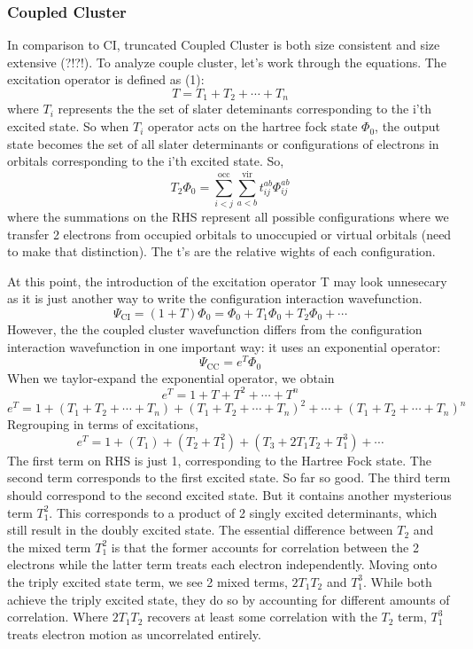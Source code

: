 \documentclass{article}
\begin{document}
    \subsubsection{Coupled Cluster}
      In comparison to CI, truncated Coupled Cluster is both size consistent
      and size extensive (?!?!).
      To analyze couple cluster, let's work through the equations. The
      excitation operator is defined as (1):
      \[T = T_1 + T_2 +\cdots+ T_n\]
      where \(T_i\) represents the the set of slater deteminants corresponding
      to the i'th excited state. So when \(T_i\) operator acts on the hartree
      fock state \(\Phi_0\), the output state becomes the set of all
      slater determinants or configurations of electrons in orbitals corresponding
      to the i'th excited state. So,
      \[T_2\Phi_0 = \sum_{i<j}^{\text{occ}}\sum_{a<b}^{\text{vir}}t_{ij}^{ab}\Phi_{ij}^{ab}\]
      where the summations on the RHS represent all possible configurations
      where we transfer 2 electrons from occupied orbitals to unoccupied or virtual
      orbitals (need to make that distinction). The t's are the relative wights of
      each configuration.

      At this point, the introduction of the excitation operator T may look
      unnesecary as it is just another way to write the configuration
      interaction wavefunction.
      \[\Psi_{\text{CI}} = (1+T)\Phi_0 = \Phi_0 + T_1\Phi_0 + T_2\Phi_0 +\cdots \]
      However, the the coupled cluster wavefunction differs from the configuration
      interaction wavefunction in one important way: it uses an exponential
      operator:
      \[\Psi_{\text{CC}} = e^{T}\Phi_0\]
      When we taylor-expand the exponential operator, we obtain
      \[e^T = 1 + T + T^2 +\cdots+ T^n\]
      \[e^T = 1 + (T_1 + T_2 +\cdots+ T_n) + (T_1 + T_2 +\cdots+ T_n)^2 +\cdots+ (T_1 + T_2 +\cdots+ T_n)^n \]
      Regrouping in terms of excitations,
      \[e^T = 1 + (T_1) + (T_2 + T_1^2) + (T_3 + 2T_1T_2 + T_1^3) +\cdots\]
      The first term on RHS is just 1, corresponding to the Hartree Fock state. The
      second term corresponds to the first excited state. So far so good. The third
      term should correspond to the second excited state. But it contains another
      mysterious term \(T_1^2\). This corresponds to a product of 2 singly excited
      determinants, which still result in the doubly excited state. The essential
      difference between \(T_2\) and the mixed term \(T_1^2\) is that the former
      accounts for correlation between the 2 electrons while the latter term treats
      each electron independently. Moving onto the triply excited state term, we
      see 2 mixed terms, \(2T_1T_2\) and \(T_1^3\). While both achieve the triply
      excited state, they do so by accounting for different amounts of correlation.
      Where \(2T_1T_2\) recovers at least some correlation with the \(T_2\) term,
      \(T_1^3\) treats electron motion as uncorrelated entirely.
\end{document}
